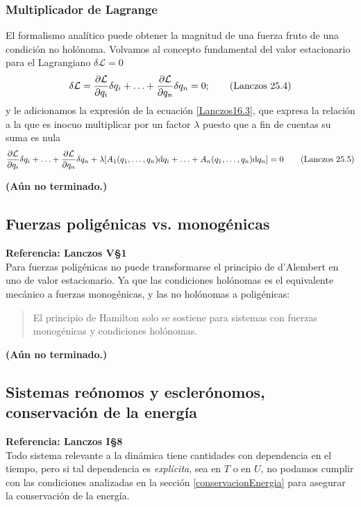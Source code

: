 \documentclass[12pt, spanish, a4paper, ]{article}
\begin{document}
\subsubsection{Multiplicador de Lagrange}
El formalismo analítico puede obtener la magnitud de una fuerza fruto de una condición no holónoma.
Volvamos al concepto fundamental del valor estacionario para el Lagrangiano \(\delta \mathcal{L} = 0\)
\begin{equation}\label{Lanczos25.4}
	\delta \mathcal{L} = \pdv{\mathcal{L}}{q_i} \delta q_i+ \ldots+ \pdv{\mathcal{L}}{q_n} \delta q_n= 0;
	\tag{Lanczos 25.4}
\end{equation}
y le adicionamos la expresión de la ecuación \eqref{Lanczos16.3}, que expresa la relación a la que es inocuo multiplicar por un factor \(\lambda\) puesto que a fin de cuentas su suma es nula
\begin{equation}\label{Lanczos25.5}
	\pdv{\mathcal{L}}{q_i} \delta q_i+ \ldots+ \pdv{\mathcal{L}}{q_n} \delta q_n + \lambda \qty[ A_1(q_1,\ldots,q_n) \dd q_i+\ldots+ A_n(q_1,\ldots,q_n) \dd q_n ] = 0
	\tag{Lanczos 25.5}
\end{equation}

\textbf{(Aún no terminado.)}


\subsection{Fuerzas poligénicas vs. monogénicas}
\textbf{Referencia: Lanczos V\S1}\\

Para fuerzas poligénicas no puede transformarse el principio de d'Alembert en uno de valor estacionario.
Ya que las condiciones holónomas es el equivalente mecánico a fuerzas monogénicas, y las no holónomas a poligénicas:
\begin{quote}
El principio de Hamilton solo se sostiene para sistemas con fuerzas monogénicas y condiciones holónomas.
\end{quote}

\textbf{(Aún no terminado.)}


\subsection{Sistemas reónomos y esclerónomos, conservación de la energía}
\textbf{Referencia: Lanczos I\S8}\\

Todo sistema relevante a la dinámica tiene cantidades con dependencia en el tiempo, pero si tal dependencia es \emph{explícita}, sea en \(T\) o en \(U\), no podamos cumplir con las condiciones analizadas en la sección \ref{conservacionEnergia} para asegurar la conservación de la energía.
\end{document}
